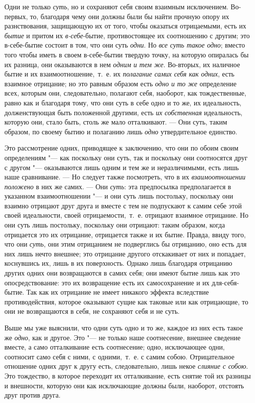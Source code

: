 Одни не только {\em суть}, но и сохраняют себя своим
взаимным исключением. Во-первых, то, благодаря чему они должны были бы
найти прочную опору их разнствования, защищающую их от того, чтобы
оказаться отрицаемыми, есть их {\em бытие} и притом их
{\em в-себе}{}-бытие, противостоящее их соотношению с
другим; это в-себе-бытие состоит в том, что они суть
{\em одни}. Но {\em все суть такое
одно}; вместо того чтобы иметь в своем в-себе-бытии твердую точку, на
которую опиралась бы их разница, они оказываются в нем
{\em одним и тем же}. Во-вторых, их наличное бытие и их
взаимоотношение,~т.~е. их {\em полагание самих себя как
одних}, есть взаимное отрицание; но это равным образом есть
{\em одно и то же} определение всех, которым они,
следовательно, полагают себя, наоборот, как тождественные, равно как и
благодаря тому, что они суть в себе одно и то же, их идеальность,
долженствующая быть положенной другими, есть {\em их
собственная} идеальность, которую они, стало быть, столь же мало
отталкивают. — Они суть, таким образом, по своему бытию и полаганию лишь
{\em одно} утвердительное единство.

Это рассмотрение одних, приводящее к заключению, что они по обоим своим
определениям "--- как поскольку они суть, так и поскольку они соотносятся друг
с другом "--- оказываются лишь одним и тем же и неразличимыми, есть лишь наше
сравнивание. — Но следует также посмотреть, что в их
{\em взаимоотношении положено} в них же самих. — Они
{\em суть}: эта предпосылка предполагается в указанном
взаимоотношении "--- и они суть лишь постольку, поскольку они взаимно отрицают
друг друга и вместе с тем не подпускают к самим себе этой своей
идеальности, своей отрицаемости,~т.~е. отрицают взаимное отрицание. Но они
суть лишь постольку, поскольку они отрицают: таким образом, когда
отрицается это их отрицание, отрицается также и их бытие. Правда, ввиду
того, что они {\em суть}, они этим отрицанием не
подверглись бы отрицанию, оно есть для них лишь нечто внешнее; это
отрицание другого отскакивает от них и попадает, коснувшись их, лишь в их
поверхность. Однако лишь благодаря отрицанию других одних они возвращаются
в самих себя; они имеют бытие лишь как это опосредствование: это их
возвращение есть их самосохранение и их для-себя-бытие. Так как их
отрицание не имеет никакого эффекта вследствие противодействия, которое
оказывают сущие как таковые или как отрицающие, то они не возвращаются в
себя, не сохраняют себя и не суть.

Выше мы уже выяснили, что одни суть одно и то же, каждое из них есть такое
же {\em одно}, как и другое. Это "--- не только наше
соотнесение, внешнее сведение вместе, а само отталкивание есть соотнесение;
одно, исключающее одни, соотносит само себя с ними, с одними,~т.~е. с самим
собою. Отрицательное отношение одних друг к другу есть, следовательно, лишь
некое {\em слияние с собою}. Это тождество, в которое
переходит их отталкивание, есть снятие той их разницы и внешности, которую
они как исключающие должны были, наоборот, отстоять друг против друга.

